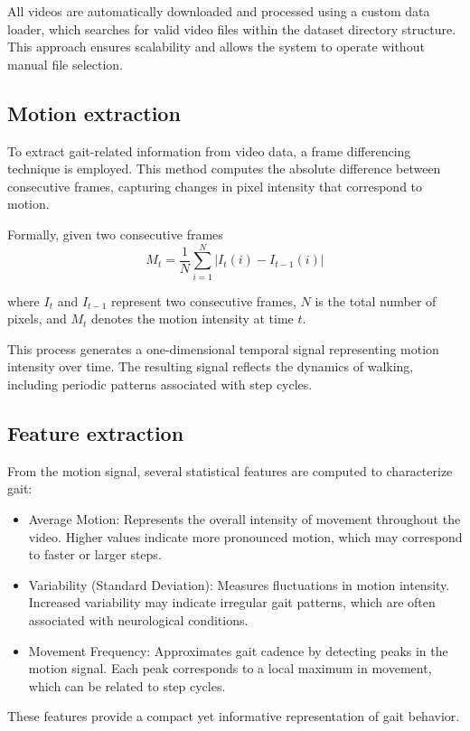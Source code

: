 \documentclass[12pt,a4paper]{article} %
\begin{document}
All videos are automatically downloaded and processed using a custom data loader, which searches for valid video files within the dataset directory structure. This approach ensures scalability and allows the system to operate without manual file selection.

\subsection{Motion extraction}
To extract gait-related information from video data, a frame differencing technique is employed. This method computes the absolute difference between consecutive frames, capturing changes in pixel intensity that correspond to motion.

Formally, given two consecutive frames 
\begin{equation}
M_t = \frac{1}{N} \sum_{i=1}^{N} \left| I_t(i) - I_{t-1}(i) \right|
\end{equation}

where $I_t$ and $I_{t-1}$ represent two consecutive frames, $N$ is the total number of pixels, and $M_t$ denotes the motion intensity at time $t$.

This process generates a one-dimensional temporal signal representing motion intensity over time. The resulting signal reflects the dynamics of walking, including periodic patterns associated with step cycles.

\subsection{Feature extraction}
From the motion signal, several statistical features are computed to characterize gait:
\begin{itemize}
  \item Average Motion: Represents the overall intensity of movement throughout the video. Higher values indicate more pronounced motion, which may correspond to faster or larger steps.
  \item Variability (Standard Deviation): Measures fluctuations in motion intensity. Increased variability may indicate irregular gait patterns, which are often associated with neurological conditions.
  \item Movement Frequency: Approximates gait cadence by detecting peaks in the motion signal. Each peak corresponds to a local maximum in movement, which can be related to step cycles.
\end{itemize}

These features provide a compact yet informative representation of gait behavior.
\end{document}
